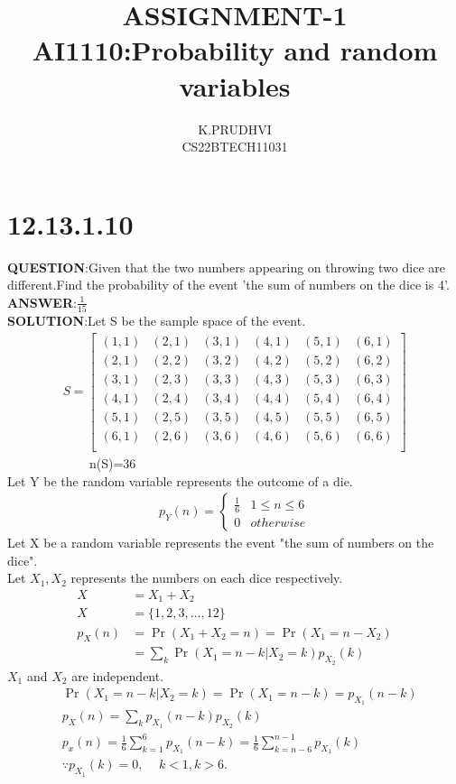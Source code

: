 \documentclass[journal,12pt,twocolumn]{IEEEtran}
\title{ASSIGNMENT-1\\AI1110:Probability and random variables}
\author{K.PRUDHVI\\CS22BTECH11031}
\providecommand{\pr}[1]{\ensuremath{\Pr\left(#1\right)}}
\theoremstyle{remark}
\begin{document}
\maketitle
\section*{\textbf{12.13.1.10}}
\noindent \textbf{QUESTION}:Given that the two numbers appearing on throwing two dice are different.Find the probability of the event 'the sum of numbers on the dice is 4'.\\
\noindent \textbf{ANSWER}:$\frac{1}{15}$\\[3pt]
\noindent \textbf{SOLUTION}:Let S be the sample space of the event.
\begin{align*}
S=
\begin{bmatrix}
(1,1) & (2,1) & (3,1) & (4,1) & (5,1) & (6,1) \\
(2,1) & (2,2) & (3,2) & (4,2) & (5,2) & (6,2) \\
(3,1) & (2,3) & (3,3) & (4,3) & (5,3) & (6,3) \\
(4,1) & (2,4) & (3,4) & (4,4) & (5,4) & (6,4) \\
(5,1) & (2,5) & (3,5) & (4,5) & (5,5) & (6,5) \\
(6,1) & (2,6) & (3,6) & (4,6) & (5,6) & (6,6) \\
\end{bmatrix}
\end{align*}
\ \ \ \ \ \ \ \ \ \ \ \ \ n(S)=36\\
Let Y be the random variable represents the outcome of a die.\\
\begin{align*}
  p_Y(n)=
  \begin{cases}
    \frac{1}{6} & 1 \leq n \leq 6 \\
    0 & otherwise
  \end{cases}
  \tag{1.1}
  \end{align*}
Let X be a random variable represents the event "the sum of numbers on the dice".\\
Let $X_1,X_2$ represents the numbers on each dice respectively.
\begin{align*}
X&=X_1+X_2\\
X&=\{1,2,3,\dots,12\}\\
p_X(n)&=\pr{X_1+X_2=n}=\pr{X_1=n-X_2}\\
      &=\sum_{k}\pr{X_1=n-k|X_2=k}p_{X_2}(k)
\end{align*}
$X_1$ and $X_2$ are independent.
\begin{align*}
  &\pr{X_1=n-k|X_2=k}=\pr{X_1=n-k}=p_{X_1}(n-k)\\
  &p_X(n)=\sum_k{p_{X_1}(n-k)p_{X_2}(k)}\\
  &p_x(n)=\frac{1}{6}\sum_{k=1}^{6}p_{X_1}(n-k)=\frac{1}{6}\sum_{k=n-6}^{n-1}p_{X_1}(k)  \tag{1.2}\\
  &\because p_{X_1}(k)=0,\,\,\,\,\,\,\,k<1,k>6.
\end{align*}
\end{document}
